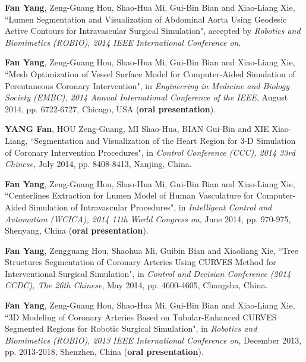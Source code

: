 
\begin{publications}{99}

\item \textbf{Fan Yang}, Zeng-Guang Hou, Shao-Hua Mi, Gui-Bin Bian and Xiao-Liang Xie, ``Lumen Segmentation and Visualization of Abdominal Aorta Using Geodesic Active Contours for Intravascular Surgical Simulation", accepted by \textit{Robotics and Biomimetics (ROBIO), 2014 IEEE International Conference on}.%

\item \textbf{Fan Yang}, Zeng-Guang Hou, Shao-Hua Mi, Gui-Bin Bian and Xiao-Liang Xie, ``Mesh Optimization of Vessel Surface Model for Computer-Aided Simulation of Percutaneous Coronary Intervention", in \textit{Engineering in Medicine and Biology Society (EMBC), 2014 Annual International Conference of the IEEE}, August 2014, pp. 6722-6727, Chicago, USA (\textbf{oral presentation}).%

\item \textbf{YANG Fan}, HOU Zeng-Guang, MI Shao-Hua, BIAN Gui-Bin and XIE Xiao-Liang, ``Segmentation and Visualization of the Heart Region for 3-D Simulation of Coronary Intervention Procedures", in \textit{Control Conference (CCC), 2014 33rd Chinese}, July 2014, pp. 8408-8413, Nanjing, China.%

\item \textbf{Fan Yang}, Zeng-Guang Hou, Shao-Hua Mi, Gui-Bin Bian and Xiao-Liang Xie, ``Centerlines Extraction for Lumen Model of Human Vasculature for Computer-Aided Simulation of Intravascular Procedures", in \textit{Intelligent Control and Automation (WCICA), 2014 11th World Congress on}, June 2014, pp. 970-975, Shenyang, China (\textbf{oral presentation}).%

\item \textbf{Fan Yang}, Zengguang Hou, Shaohua Mi, Guibin Bian and Xiaoliang Xie, ``Tree Structures Segmentation of Coronary Arteries Using CURVES Method for Interventional Surgical Simulation", in \textit{Control and Decision Conference (2014 CCDC), The 26th Chinese}, May 2014, pp. 4600-4605, Changsha, China.%

\item \textbf{Fan Yang}, Zeng-Guang Hou, Shao-Hua Mi, Gui-Bin Bian and Xiao-Liang Xie, ``3D Modeling of Coronary Arteries Based on Tubular-Enhanced CURVES Segmented Regions for Robotic Surgical Simulation", in \textit{Robotics and Biomimetics (ROBIO), 2013 IEEE International Conference on}, December 2013, pp. 2013-2018, Shenzhen, China (\textbf{oral presentation}).%


\end{publications}

